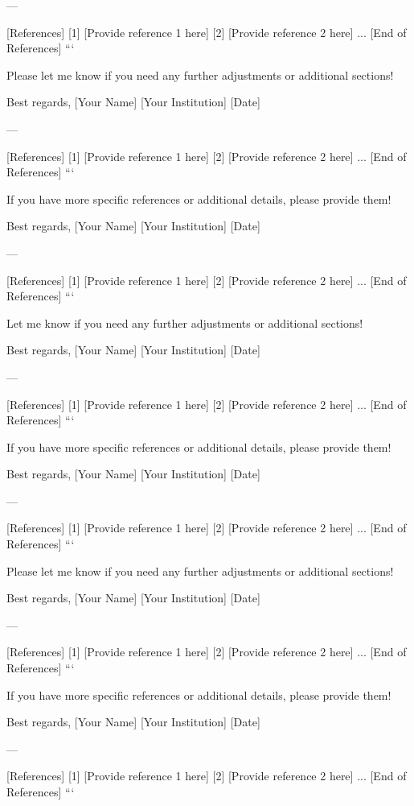 --- 

[References]  
[1] [Provide reference 1 here]  
[2] [Provide reference 2 here]  
...  
[End of References]  
``` 

Please let me know if you need any further adjustments or additional sections! 

Best regards,  
[Your Name]  
[Your Institution]  
[Date]  

--- 

[References]  
[1] [Provide reference 1 here]  
[2] [Provide reference 2 here]  
...  
[End of References]  
``` 

If you have more specific references or additional details, please provide them! 

Best regards,  
[Your Name]  
[Your Institution]  
[Date]  

--- 

[References]  
[1] [Provide reference 1 here]  
[2] [Provide reference 2 here]  
...  
[End of References]  
``` 

Let me know if you need any further adjustments or additional sections! 

Best regards,  
[Your Name]  
[Your Institution]  
[Date]  

--- 

[References]  
[1] [Provide reference 1 here]  
[2] [Provide reference 2 here]  
...  
[End of References]  
``` 

If you have more specific references or additional details, please provide them! 

Best regards,  
[Your Name]  
[Your Institution]  
[Date]  

--- 

[References]  
[1] [Provide reference 1 here]  
[2] [Provide reference 2 here]  
...  
[End of References]  
``` 

Please let me know if you need any further adjustments or additional sections! 

Best regards,  
[Your Name]  
[Your Institution]  
[Date]  

--- 

[References]  
[1] [Provide reference 1 here]  
[2] [Provide reference 2 here]  
...  
[End of References]  
``` 

If you have more specific references or additional details, please provide them! 

Best regards,  
[Your Name]  
[Your Institution]  
[Date]  

--- 

[References]  
[1] [Provide reference 1 here]  
[2] [Provide reference 2 here]  
...  
[End of References]  
``` 

